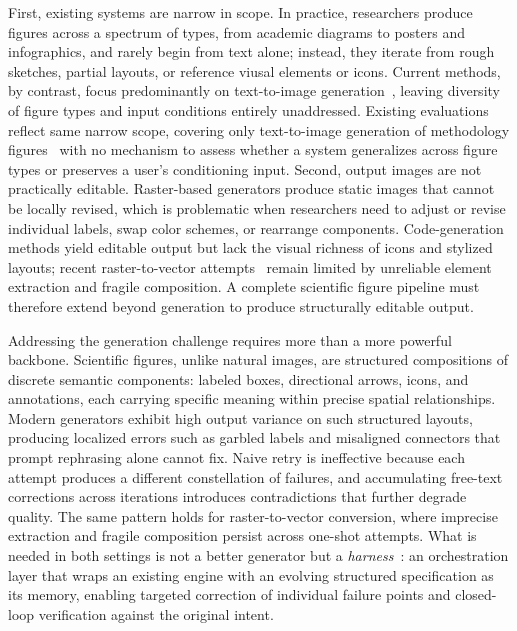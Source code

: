 \documentclass{llmxive}
\begin{document}
First, existing systems are narrow in scope. In practice, researchers produce figures across a spectrum of types, from academic diagrams to posters and infographics, and rarely begin from text alone; instead, they iterate from rough sketches, partial layouts, or reference viusal elements or icons. Current methods, by contrast, focus predominantly on text-to-image generation~\citep{zhu2026paperbanana,zhu2026autofigure,guo2026paper2sysarch,sun2025p2p}, leaving diversity of figure types and input conditions entirely unaddressed. Existing evaluations reflect same narrow scope, covering only text-to-image generation of methodology figures~\citep{zhu2026paperbanana} with no mechanism to assess whether a system generalizes across figure types or preserves a user's conditioning input.
Second, output images are not practically editable. Raster-based generators produce static images that cannot be locally revised, which is problematic when researchers need to adjust or revise individual labels, swap color schemes, or rearrange components. Code-generation methods yield editable output but lack the visual richness of icons and stylized layouts; recent raster-to-vector attempts~\citep{lin2026autofigureedit,editbanana2026} remain limited by unreliable element extraction and fragile composition. A complete scientific figure pipeline must therefore extend beyond generation to produce structurally editable output.

Addressing the generation challenge requires more than a more powerful backbone.
Scientific figures, unlike natural images, are structured
compositions of discrete semantic components: labeled boxes, directional arrows, icons, and annotations, each carrying specific meaning within precise spatial relationships.
Modern generators exhibit high output variance on such structured layouts, producing localized errors such as garbled labels and misaligned connectors that prompt rephrasing alone cannot fix. Naive retry is ineffective because each attempt produces a different constellation of failures, and accumulating free-text corrections across iterations introduces contradictions that further degrade quality. The same pattern holds for raster-to-vector conversion, where imprecise extraction and fragile composition persist across one-shot attempts. What is needed in both settings is not a better generator but a \emph{harness}~\citep{young2025harness,pan2026nlaharnesses,bui2026opendev, si2026contextskillslanguagemodels}: an orchestration layer that wraps an existing engine with an evolving structured specification as its memory, enabling targeted correction of individual failure points and closed-loop verification against the original intent.
\end{document}
